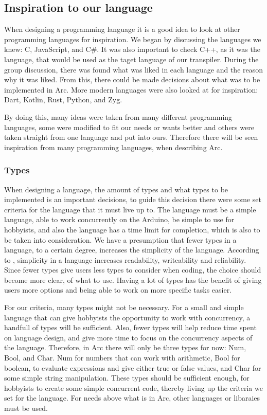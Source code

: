 \subsection{Inspiration to our language}\label{sec:inspiration}
When designing a programming language it is a good idea to look at other programming languages for inspiration. We began by discussing the languages we knew: C, JavaScript, and C\#. It was also important to check C++, as it was the language, that would be used as the taget language of our transpiler. During the group discussion, there was found what was liked in each language and the reason why it was liked. From this, there could be made decisions about what was to be implemented in Arc. More modern languages were also looked at for inspiration: Dart, Kotlin, Rust, Python, and Zyg. 

By doing this, many ideas were taken from many different programming languages, some were modified to fit our needs or wants better and others were taken straight from one language and put into ours. Therefore there will be seen inspiration from many programming languages, when describing Arc.

\subsubsection{Types}\label{sec:types}
When designing a language, the amount of types and what types to be implemented is an important decisions, to guide this decision there were some set criteria for the language that it must live up to. The language must be a simple language, able to work concurrently on the Arduino, be simple to use for hobbyists, and also the language has a time limit for completion, which is also to be taken into consideration. We have a presumption that fewer types in a language, to a certain degree, increases the simplicity of the language. According to , simplicity in a language increases readability, writeability and reliability. Since fewer types give users less types to consider when coding, the choice should become more clear, of what to use. Having a lot of types has the benefit of giving users more options and being able to work on more specific tasks easier.

For our criteria, many types might not be necessary. For a small and simple language that can give hobbyists the opportunity to work with concurrency, a handfull of types will be sufficient. Also, fewer types will help reduce time spent on language design, and give more time to focus on the concurrency aspects of the language. Therefore, in Arc there will only be three types for now: Num, Bool, and Char. Num for numbers that can work with arithmetic, Bool for boolean, to evaluate expressions and give either true or false values, and Char for some simple string manipulation. These types should be sufficient enough, for hobbyists to create some simple concurrent code, thereby living up the criteria we set for the language. For needs above what is in Arc, other languages or libaraies must be used. 

